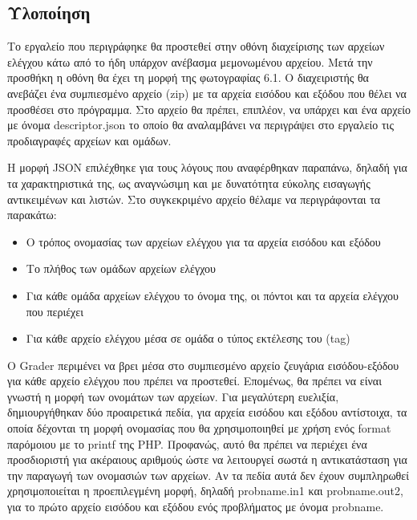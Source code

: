 \documentclass[diploma]{softlab-thesis}
\begin{document}
\subsection{Υλοποίηση}

Το εργαλείο που περιγράφηκε θα προστεθεί στην οθόνη διαχείρισης των αρχείων
ελέγχου κάτω από το ήδη υπάρχον ανέβασμα μεμονωμένου αρχείου. Μετά την προσθήκη
η οθόνη θα έχει τη μορφή της φωτογραφίας 6.1. Ο διαχειριστής θα ανεβάζει ένα
συμπιεσμένο αρχείο (zip) με τα αρχεία εισόδου και εξόδου που θέλει να προσθέσει
στο πρόγραμμα. Στο αρχείο θα πρέπει, επιπλέον, να υπάρχει και ένα αρχείο με
όνομα descriptor.json το οποίο θα αναλαμβάνει να περιγράψει στο εργαλείο τις
προδιαγραφές αρχείων και ομάδων.

\bigskip

Η μορφή JSON επιλέχθηκε για τους λόγους που αναφέρθηκαν παραπάνω, δηλαδή για τα
χαρακτηριστικά της, ως αναγνώσιμη και με δυνατότητα εύκολης εισαγωγής αντικειμένων
και λιστών. Στο συγκεκριμένο αρχείο θέλαμε να περιγράφονται τα παρακάτω:

\begin{itemize}
    \item Ο τρόπος ονομασίας των αρχείων ελέγχου για τα αρχεία εισόδου και εξόδου

    \item Το πλήθος των ομάδων αρχείων ελέγχου

    \item Για κάθε ομάδα αρχείων ελέγχου το όνομα της, οι πόντοι
      και τα αρχεία ελέγχου που περιέχει

    \item Για κάθε αρχείο ελέγχου μέσα σε ομάδα ο τύπος εκτέλεσης του (tag)

\end{itemize}

Ο Grader περιμένει να βρει μέσα στο συμπιεσμένο αρχείο ζευγάρια εισόδου-εξόδου
για κάθε αρχείο ελέγχου που πρέπει να προστεθεί. Επομένως, θα πρέπει να είναι
γνωστή η μορφή των ονομάτων των αρχείων. Για μεγαλύτερη ευελιξία,
δημιουργήθηκαν δύο προαιρετικά πεδία, για αρχεία εισόδου και εξόδου αντίστοιχα,
τα οποία δέχονται τη μορφή ονομασίας που θα χρησιμοποιηθεί με χρήση ενός format
παρόμοιου με το printf της PHP. Προφανώς, αυτό θα πρέπει να περιέχει ένα
προσδιοριστή για ακέραιους αριθμούς ώστε να λειτουργεί σωστά η αντικατάσταση
για την παραγωγή των ονομασιών των αρχείων. Αν τα πεδία αυτά δεν έχουν
συμπληρωθεί χρησιμοποιείται η προεπιλεγμένη μορφή, δηλαδή probname.in1 και
probname.out2, για το πρώτο αρχείο εισόδου και εξόδου ενός προβλήματος με όνομα
probname.
\end{document}

